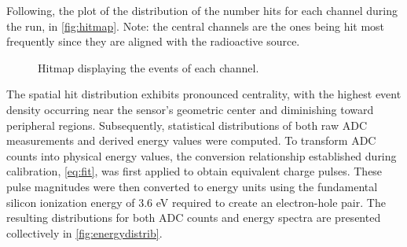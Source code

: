 Following, the plot of the distribution of the number hits for each channel during the run, in \autoref{fig:hitmap}. Note: the central channels are the ones being hit most frequently since
they are aligned with the radioactive source.

\begin{figure}[H]
	\centering
	\caption{Hitmap displaying the events of each channel.}
	\label{fig:hitmap}
\end{figure}

The spatial hit distribution exhibits pronounced centrality, with the highest event density occurring near the sensor's geometric center and diminishing toward peripheral regions. Subsequently, statistical distributions of both raw ADC measurements and derived energy values were computed. To transform ADC counts into physical energy values, the conversion relationship established during calibration, \cref{eq:fit}, was first applied to obtain equivalent charge pulses. These pulse magnitudes were then converted to energy units using the fundamental silicon ionization energy of 3.6 eV required to create an electron-hole pair. The resulting distributions for both ADC counts and energy spectra are presented collectively in \autoref{fig:energydistrib}.


